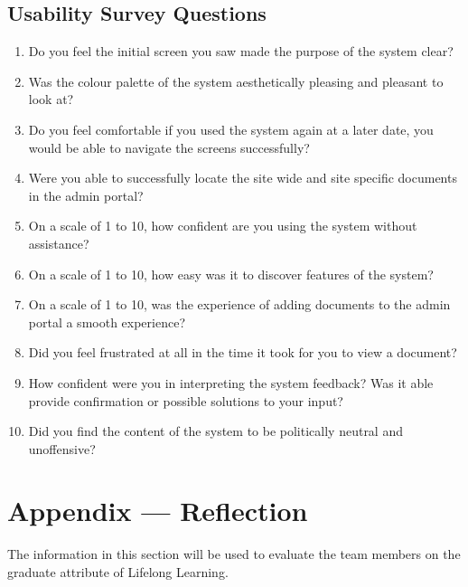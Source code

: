 \documentclass[12pt, titlepage]{article}
\begin{document}
\subsection{Usability Survey Questions}
\begin{enumerate}
  \item Do you feel the initial screen you saw made the purpose of
    the system clear?
  \item Was the colour palette of the system aesthetically pleasing
    and pleasant to look at?
  \item Do you feel comfortable if you used the system again at a
    later date, you would be able to navigate the screens successfully?
  \item Were you able to successfully locate the site wide and site
    specific documents in the admin portal?
  \item On a scale of 1 to 10, how confident are you using the system
    without assistance?
  \item On a scale of 1 to 10, how easy was it to discover features
    of the system?
  \item On a scale of 1 to 10, was the experience of adding documents
    to the admin portal a smooth experience?
  \item Did you feel frustrated at all in the time it took for you to
    view a document?
  \item How confident were you in interpreting the system feedback? Was it able
    provide confirmation or possible solutions to your input?
  \item Did you find the content of the system to be politically neutral and
    unoffensive?
\end{enumerate}

\newpage{}
\section*{Appendix --- Reflection}

The information in this section will be used to evaluate the team members on the
graduate attribute of Lifelong Learning.


\end{document}
